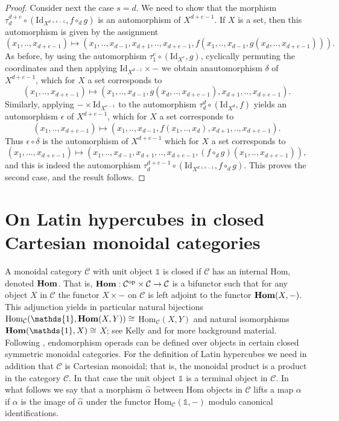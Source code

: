 \documentclass{amsart} %
\theoremstyle{plain}\newtheorem{Theorem}{Theorem}[section]
\theoremstyle{plain}\newtheorem{Conjecture}[Theorem]{Conjecture}
\theoremstyle{plain}\newtheorem{Corollary}[Theorem]{Corollary}
\theoremstyle{plain}\newtheorem{Lemma}[Theorem]{Lemma}
\theoremstyle{plain}\newtheorem{Proposition}[Theorem]{Proposition}
\theoremstyle{definition}\newtheorem{Definition}[Theorem]{Definition}
\theoremstyle{definition}\newtheorem{Example}[Theorem]{Example}
\theoremstyle{definition}\newtheorem{Examples}[Theorem]{Examples}
\theoremstyle{definition}\newtheorem{Remark}[Theorem]{Remark}
\theoremstyle{definition}\newtheorem{Remarks}[Theorem]{Remarks}
\theoremstyle{plain}\newtheorem{Statement}[Theorem]{}
\def\CC{{\mathcal{C}}}    \def\OP{{\mathcal{O}P}}
\def\One{{\mathds{1}}}
\def\Hom{\mathrm{Hom}}           \def\tenkS{\otimes_{kS}}
\def\Id{\mathrm{Id}}             \def\tenA{\otimes_A}
\def\op{\mathrm{op}}
\begin{document}
\begin{proof}
\medskip
Consider next the case $s=d$. We need to show that the morphism
$\tau^{d+e}_d\circ (\Id_{X^{d+e-1}}, f\circ_d g)$ is an automorphism of $X^{d+e-1}$.
If $X$ is a set, then this automorphism is given by the assignment
$$(x_1,..,x_{d+e-1}) \mapsto   
(x_1,..,x_{d-1},x_{d+1},..,x_{d+e-1}, f(x_1,..,x_{d-1},g(x_d,..,x_{d+e-1}))).$$
As before, by using the automorphism $\tau^e_1\circ (\Id_{X^e}, g)$,
cyclically permuting the  coordinates and then applying $\Id_{X^{d-1}}\times-$
 we obtain anautomorphism $\delta$ of $X^{d+e-1}$, which for $X$ a set
 corresponds to
 $$(x_1,..,x_{d+e-1}) \mapsto (x_1,..,x_{d-1}, g(x_d,..,x_{d+e-1}), x_{d+1},..,x_{d+e-1}).$$
 Similarly, applying $-\times \Id_{X^{e-1}}$ to the automorphism 
 $\tau^d_d\circ (\Id_{X^d}, f)$ yields an automorphism $\epsilon$ of $X^{d+e-1}$,
 which for $X$ a set corresponds to
 $$(x_1,..,x_{d+e-1}) \mapsto (x_1,..,x_{d-1}, f(x_1,..,x_d), x_{d+1},..,x_{d+e-1}).$$
 Thus $\epsilon\circ\delta$ is the automorphism of $X^{d+e-1}$ which for $X$ a set
 corresponds to 
 $$(x_1,...,x_{d+e-1}) \mapsto (x_1,..,x_{d-1},x_{d+1},..,x_{d+e-1}, (f\circ_d g)(x_1,..,x_{d+e-1})),$$
 and this is indeed the automorphism $\tau^{d+e-1}_d\circ (\Id_{X^{d+e-1}}, f\circ_d g)$.
 This proves the second case, and the result follows.
\end{proof}

\section{On Latin hypercubes in closed Cartesian monoidal categories}
\label{closedSection}

A monoidal category  $\CC$ with unit object $\One$  is closed if $\CC$ has an internal Hom, denoted 
$\mathbf{Hom}$. That is, $\bHom : \CC^\op\times \CC\to \CC$
is a bifunctor such that for any object $X$ in $\CC$
the functor $X\times -$ on $\CC$ is left adjoint to the functor $\mathbf{Hom}(X,-)$. 
This adjunction yields in particular natural bijections
$\Hom_\CC(\One, \bHom(X,Y))\cong$ $\Hom_\CC(X,Y)$ and natural
isomorphisms $\bHom(\One, X)\cong$ $X$;
see Kelly \cite{Kelly82} and \cite{MacMoe} 
for more background material. Following \cite{Kelly05}, 
endomorphism operads  can be defined over objects in certain closed symmetric 
monoidal categories.
For the definition of Latin hypercubes we need in addition that  
$\CC$ is Cartesian monoidal; that is, the monoidal product is a product in the
category $\CC$. In that case the unit object $\One$ is a terminal object in $\CC$.   
In what follows we say that a morphism $\hat\alpha$ between Hom objects in $\CC$ 
lifts a map $\alpha$ if $\alpha$ is the image of 
$\hat\alpha$ under the functor $\Hom_\CC(\One,-)$ modulo canonical identifications.
\end{document}
